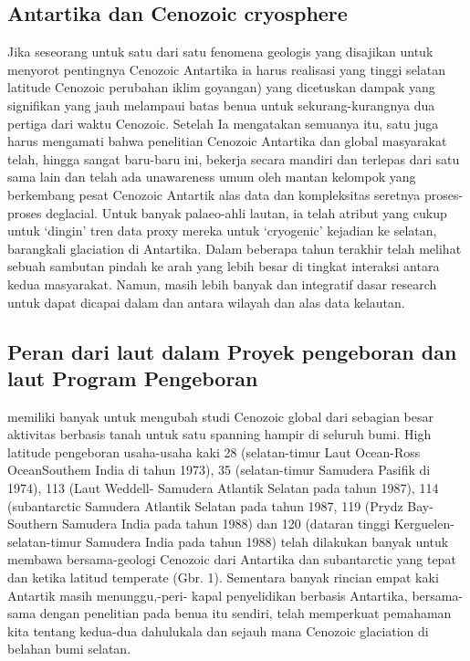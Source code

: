\subsection{Antartika dan Cenozoic cryosphere}

		Jika seseorang untuk satu dari satu fenomena geologis yang disajikan untuk menyorot pentingnya Cenozoic Antartika ia harus realisasi yang tinggi 
	selatan latitude Cenozoic perubahan iklim goyangan) yang dicetuskan dampak yang signifikan yang jauh melampaui batas benua untuk sekurang-kurangnya 
	dua pertiga dari waktu Cenozoic. Setelah Ia mengatakan semuanya itu, satu juga harus mengamati bahwa penelitian Cenozoic Antartika dan global 
	masyarakat telah, hingga sangat baru-baru ini, bekerja secara mandiri dan terlepas dari satu sama lain dan telah ada unawareness umum oleh mantan 
	kelompok yang berkembang pesat Cenozoic Antartik alas data dan kompleksitas seretnya proses-proses deglacial. Untuk banyak palaeo-ahli lautan, 
	ia telah atribut yang cukup untuk `dingin' tren data proxy mereka untuk `cryogenic' kejadian ke selatan, barangkali glaciation di Antartika. 
	Dalam beberapa tahun terakhir telah melihat sebuah sambutan pindah ke arah yang lebih besar di tingkat interaksi antara kedua masyarakat. 
	Namun, masih lebih banyak dan integratif dasar research untuk dapat dicapai dalam dan antara wilayah dan alas data kelautan.
	
	
\subsection{Peran dari laut dalam Proyek pengeboran dan laut Program Pengeboran}
		
		memiliki banyak untuk mengubah studi Cenozoic global dari sebagian besar aktivitas berbasis tanah untuk satu spanning hampir di seluruh bumi. 
	High latitude pengeboran usaha-usaha kaki 28 (selatan-timur Laut Ocean-Ross OceanSouthem India di tahun 1973), 35 (selatan-timur Samudera Pasifik di 1974), 
	113 (Laut Weddell- Samudera Atlantik Selatan pada tahun 1987), 114 (subantarctic Samudera Atlantik Selatan pada tahun 1987, 
	119 (Prydz Bay-Southern Samudera India pada tahun 1988) dan 120 (dataran tinggi Kerguelen-selatan-timur Samudera India pada tahun 1988) telah dilakukan 
	banyak untuk membawa bersama-geologi Cenozoic dari Antartika dan subantarctic yang tepat dan ketika latitud temperate (Gbr. 1). 
	Sementara banyak rincian empat kaki Antartik masih menunggu,-peri- kapal penyelidikan berbasis Antartika, bersama-sama dengan penelitian pada benua itu 
	sendiri, telah memperkuat pemahaman kita tentang kedua-dua dahulukala dan sejauh mana Cenozoic glaciation di belahan bumi selatan.
	

